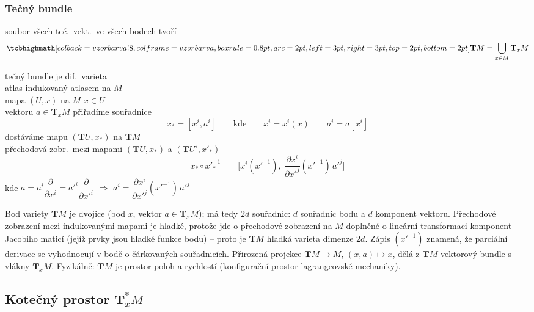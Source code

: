 \subsubsection*{Tečný bundle}
\begin{definice}
soubor všech teč.\ vekt.\ ve všech bodech tvoří 
\[
  \vzorec{\mathbf{T}M = \bigcup_{x\in M}\mathbf{T}_xM}
\]
\end{definice}

tečný bundle je dif.\ varieta \\
\quad atlas indukovaný atlasem na $M$ \\
\quad mapa $(U,x)$ na $M$ \qquad $x\in U$ \\
\quad vektoru $a\in\mathbf{T}_xM$ přiřadíme souřadnice
\[
  x_* = [x^i, a^i] \qquad\text{kde}\qquad x^i = x^i(x) \qquad a^i = a[x^i]
\]
\quad dostáváme mapu $(\mathbf{T}U, x_*)$ na $\mathbf{T}M$ \\
\quad přechodová zobr.\ mezi mapami $(\mathbf{T}U,x_*)$ a $(\mathbf{T}U',x'_*)$
\[
  x_*\circ x'^{-1}_* \qquad \Big[x^i(x'^{-1}),\ \frac{\partial x^i}{\partial x'^j}(x'^{-1})\,a'^j\Big]
\]
\quad kde \quad $a = a^i\dfrac{\partial}{\partial x^i} = a'^i\dfrac{\partial}{\partial x'^i}$ \quad $\Rightarrow$ \quad $a^i = \dfrac{\partial x^i}{\partial x'^j}(x'^{-1})\,a'^j$

\begin{vysvetleni}
Bod variety $\mathbf{T}M$ je dvojice (bod $x$, vektor $a\in\mathbf{T}_xM$); má tedy $2d$ souřadnic: $d$ souřadnic bodu a $d$ komponent vektoru. Přechodové zobrazení mezi indukovanými mapami je hladké, protože jde o přechodové zobrazení na $M$ doplněné o lineární transformaci komponent Jacobiho maticí (jejíž prvky jsou hladké funkce bodu) -- proto je $\mathbf{T}M$ hladká varieta dimenze $2d$. Zápis $(x'^{-1})$ znamená, že parciální derivace se vyhodnocují v bodě o čárkovaných souřadnicích. Přirozená projekce $\mathbf{T}M\to M$, $(x,a)\mapsto x$, dělá z $\mathbf{T}M$ vektorový bundle s vlákny $\mathbf{T}_xM$. Fyzikálně: $\mathbf{T}M$ je prostor poloh a rychlostí (konfigurační prostor lagrangeovské mechaniky).
\end{vysvetleni}

\newpage
{}
\subsection{Kotečný prostor $\mathbf{T}^*_xM$}

